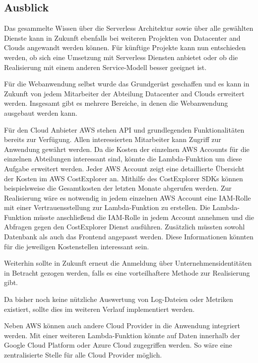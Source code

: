 \subsection{Ausblick}
Das gesammelte Wissen über die Serverless Architektur sowie über alle gewählten Dienste kann in Zukunft ebenfalls bei weiteren Projekten von Datacenter and Clouds angewandt werden können.
Für künftige Projekte kann nun entschieden werden, ob sich eine Umsetzung mit Serverless Diensten anbietet oder ob die Realisierung mit einem anderen Service-Modell besser geeignet ist.

Für die Webanwendung selbst wurde das Grundgerüst geschaffen und es kann in Zukunft von jedem Mitarbeiter der Abteilung Datacenter and Clouds erweitert werden.
Insgesamt gibt es mehrere Bereiche, in denen die Webanwendung ausgebaut werden kann.

Für den Cloud Anbieter AWS stehen API und grundlegenden Funktionalitäten bereits zur Verfügung.
Allen interessierten Mitarbeiter kann Zugriff zur Anwendung gewährt werden.
Da die Kosten der einzelnen AWS Accounts für die einzelnen Abteilungen interessant sind, könnte die Lambda-Funktion um diese Aufgabe erweitert werden.
Jeder AWS Account zeigt eine detaillierte Übersicht der Kosten im AWS CostExplorer an.
Mithilfe des CostExplorer SDKs können beispielsweise die Gesamtkosten der letzten Monate abgerufen werden.
Zur Realisierung wäre es notwendig in jedem einzelnen AWS Account eine IAM-Rolle mit einer Vertrauensstellung zur Lambda-Funktion zu erstellen.
Die Lambda-Funktion müsste anschließend die IAM-Rolle in jedem Account annehmen und die Abfragen gegen den CostExplorer Dienst ausführen.
Zusätzlich müssten sowohl Datenbank als auch das Frontend angepasst werden.
Diese Informationen könnten für die jeweiligen Kostenstellen interessant sein.

Weiterhin sollte in Zukunft erneut die Anmeldung über Unternehmensidentitäten in Betracht gezogen werden, falls es eine vorteilhaftere Methode zur Realisierung gibt.

Da bisher noch keine nützliche Auswertung von Log-Dateien oder Metriken existiert, sollte dies im weiteren Verlauf implementiert werden.

Neben AWS können auch andere Cloud Provider in die Anwendung integriert werden.
Mit einer weiteren Lambda-Funktion könnte auf Daten innerhalb der Google Cloud Platform oder Azure Cloud zugegriffen werden.
So wäre eine zentralisierte Stelle für alle Cloud Provider möglich.















